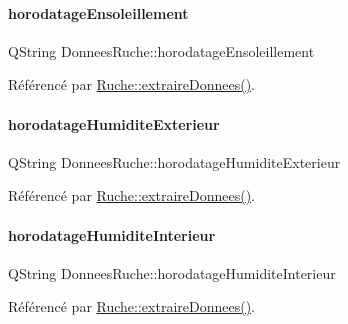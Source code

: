 \mbox{\label{struct_donnees_ruche_ae1b5a2502017455f8fbd95bdab935fd1}} 
\paragraph{\texorpdfstring{horodatage\+Ensoleillement}{horodatageEnsoleillement}}
{\footnotesize\ttfamily Q\+String Donnees\+Ruche\+::horodatage\+Ensoleillement}



Référencé par \hyperlink{class_ruche_a21c0dafeaec03d451590037343e6a3ca}{Ruche\+::extraire\+Donnees()}.

\mbox{\label{struct_donnees_ruche_af38a9a06e2f620850ba2d152f189f67b}} 
\paragraph{\texorpdfstring{horodatage\+Humidite\+Exterieur}{horodatageHumiditeExterieur}}
{\footnotesize\ttfamily Q\+String Donnees\+Ruche\+::horodatage\+Humidite\+Exterieur}



Référencé par \hyperlink{class_ruche_a21c0dafeaec03d451590037343e6a3ca}{Ruche\+::extraire\+Donnees()}.

\mbox{\label{struct_donnees_ruche_a15ebda778958380edd4acff5d6eef5b8}} 
\paragraph{\texorpdfstring{horodatage\+Humidite\+Interieur}{horodatageHumiditeInterieur}}
{\footnotesize\ttfamily Q\+String Donnees\+Ruche\+::horodatage\+Humidite\+Interieur}



Référencé par \hyperlink{class_ruche_a21c0dafeaec03d451590037343e6a3ca}{Ruche\+::extraire\+Donnees()}.

